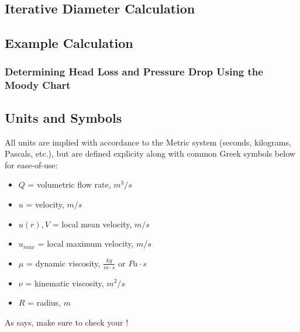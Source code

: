 \documentclass[11pt]{article} %
\numberwithin{equation}{section} %
\begin{document}
\subsection{Iterative Diameter Calculation}
\subsection{Example Calculation}
\subsubsection{Determining Head Loss and Pressure Drop Using the Moody Chart}

\subsection{Units and Symbols} \label{sec:units}
All units are implied with accordance to the Metric system (seconds, kilograms, Pascals, etc.), but are defined explicity along with common Greek symbols below for ease-of-use:
\begin{itemize}%
\item $Q$ = volumetric flow rate, $m^{3}/s$
\item $u$ = velocity, $m/s$ 
\item $u(r), V$ = local mean velocity, $m/s$ 
\item $u_{max}$ = local maximum velocity, $m/s$ 
\item $\mu$ = dynamic viscosity, $\frac{kg}{m \cdot s}$ or $Pa \cdot s$
\item $\nu$ = kinematic viscosity, $m^{2}/s$
\item $R$ = radius, $m$

\end{itemize}
As \textcite{fluid-mechanics} says, make sure to check your \textcite{pipe-roughness}!
\printbibliography
\end{document}
